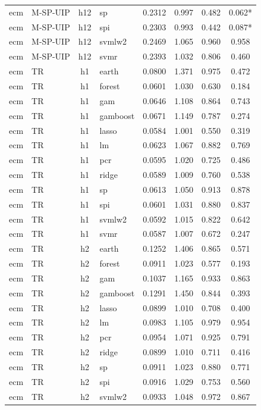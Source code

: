 \begin{ThreePartTable}
\begin{longtable}[t]{llclcccc}
ecm & M-SP-UIP & h12 & sp & 0.2312 & 0.997 & 0.482 & 0.062*\\
ecm & M-SP-UIP & h12 & spi & 0.2303 & 0.993 & 0.442 & 0.087*\\
ecm & M-SP-UIP & h12 & svmlw2 & 0.2469 & 1.065 & 0.960 & 0.958\\
ecm & M-SP-UIP & h12 & svmr & 0.2393 & 1.032 & 0.806 & 0.460\\
\addlinespace
ecm & TR & h1 & earth & 0.0800 & 1.371 & 0.975 & 0.472\\
ecm & TR & h1 & forest & 0.0601 & 1.030 & 0.630 & 0.184\\
ecm & TR & h1 & gam & 0.0646 & 1.108 & 0.864 & 0.743\\
ecm & TR & h1 & gamboost & 0.0671 & 1.149 & 0.787 & 0.274\\
ecm & TR & h1 & lasso & 0.0584 & 1.001 & 0.550 & 0.319\\
ecm & TR & h1 & lm & 0.0623 & 1.067 & 0.882 & 0.769\\
ecm & TR & h1 & pcr & 0.0595 & 1.020 & 0.725 & 0.486\\
ecm & TR & h1 & ridge & 0.0589 & 1.009 & 0.760 & 0.538\\
ecm & TR & h1 & sp & 0.0613 & 1.050 & 0.913 & 0.878\\
ecm & TR & h1 & spi & 0.0601 & 1.031 & 0.880 & 0.837\\
ecm & TR & h1 & svmlw2 & 0.0592 & 1.015 & 0.822 & 0.642\\
ecm & TR & h1 & svmr & 0.0587 & 1.007 & 0.672 & 0.247\\
\addlinespace
ecm & TR & h2 & earth & 0.1252 & 1.406 & 0.865 & 0.571\\
ecm & TR & h2 & forest & 0.0911 & 1.023 & 0.577 & 0.193\\
ecm & TR & h2 & gam & 0.1037 & 1.165 & 0.933 & 0.863\\
ecm & TR & h2 & gamboost & 0.1291 & 1.450 & 0.844 & 0.393\\
ecm & TR & h2 & lasso & 0.0899 & 1.010 & 0.708 & 0.400\\
ecm & TR & h2 & lm & 0.0983 & 1.105 & 0.979 & 0.954\\
ecm & TR & h2 & pcr & 0.0954 & 1.071 & 0.925 & 0.791\\
ecm & TR & h2 & ridge & 0.0899 & 1.010 & 0.711 & 0.416\\
ecm & TR & h2 & sp & 0.0911 & 1.023 & 0.880 & 0.771\\
ecm & TR & h2 & spi & 0.0916 & 1.029 & 0.753 & 0.560\\
ecm & TR & h2 & svmlw2 & 0.0933 & 1.048 & 0.972 & 0.867\\

\end{longtable}
\end{ThreePartTable}
